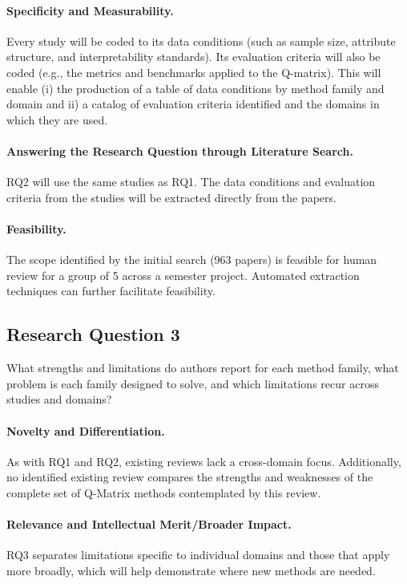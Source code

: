 \documentclass[sigconf,nonacm]{acmart}
\begin{document}
\paragraph{Specificity and Measurability.} Every study will be coded to its data conditions (such as sample size, attribute structure, and interpretability standards). Its evaluation criteria will also be coded (e.g., the metrics and benchmarks applied to the Q-matrix). This will enable (i) the production of a table of data conditions by method family and domain and ii) a catalog of evaluation criteria identified and the domains in which they are used.

\paragraph{Answering the Research Question through Literature Search.} RQ2 will use the same studies as RQ1. The data conditions and evaluation criteria from the studies will be extracted directly from the papers.

\paragraph{Feasibility.} The scope identified by the initial search (963 papers) is feasible for human review for a group of 5 across a semester project. Automated extraction techniques can further facilitate feasibility.

\subsection{Research Question 3}

What strengths and limitations do authors report for each method family, what problem is each family designed to solve, and which limitations recur across studies and domains?

\paragraph{Novelty and Differentiation.} As with RQ1 and RQ2, existing reviews lack a cross-domain focus. Additionally, no identified existing review compares the strengths and weaknesses of the complete set of Q-Matrix methods contemplated by this review.

\paragraph{Relevance and Intellectual Merit/Broader Impact.} RQ3 separates limitations specific to individual domains and those that apply more broadly, which will help demonstrate where new methods are needed.
\end{document}

